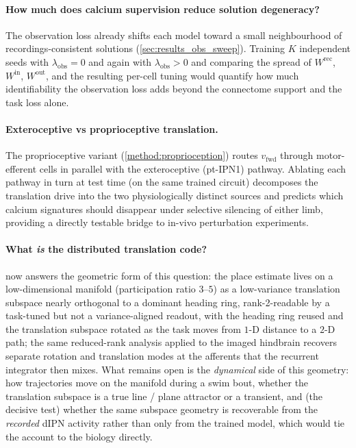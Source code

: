 \documentclass[11pt]{article}
\begin{document}
\paragraph{How much does calcium supervision reduce solution
degeneracy?}\label{out:degeneracy} The observation loss already shifts each model toward a
small neighbourhood of recordings-consistent solutions
(\cref{sec:results_obs_sweep}). Training $K$ independent seeds with
$\lambda_{\mathrm{obs}} = 0$ and again with $\lambda_{\mathrm{obs}}
> 0$ and comparing the spread of $W^{\mathrm{rec}}$, $W^{\mathrm{in}}$,
$W^{\mathrm{out}}$, and the resulting per-cell tuning would quantify
how much identifiability the observation loss adds beyond the
connectome support and the task loss alone.

\paragraph{Exteroceptive vs proprioceptive translation.}\label{out:proprio} The
proprioceptive variant (\cref{method:proprioception}) routes
$v_{\mathrm{fwd}}$ through motor-efferent cells in parallel with the
exteroceptive (pt-IPN1) pathway. Ablating each pathway in turn at
test time (on the same trained circuit) decomposes the
translation drive into the two physiologically distinct sources and
predicts which calcium signatures should disappear under selective
silencing of either limb, providing a directly testable bridge to
in-vivo perturbation experiments.

\paragraph{What \emph{is} the distributed translation code?}\label{out:manifold}
 now answers the geometric form of this
question: the place estimate lives on a low-dimensional manifold (participation
ratio $3$--$5$) as a low-variance translation subspace nearly orthogonal to a
dominant heading ring, rank-2-readable by a task-tuned but not a
variance-aligned readout, with the heading ring reused and the translation
subspace rotated as the task moves from $1$-D distance to a $2$-D path; the
same reduced-rank analysis \citet{feierstein2023} applied to the imaged
hindbrain recovers separate rotation and translation modes at the afferents
that the recurrent integrator then mixes. What remains open is the
\emph{dynamical} side of this geometry: how trajectories move on the manifold
during a swim bout, whether the translation subspace is a true line / plane
attractor or a transient, and (the decisive test) whether the same
subspace geometry is recoverable from the \emph{recorded} dIPN activity rather
than only from the trained model, which would tie the account to the biology
directly.
\end{document}
